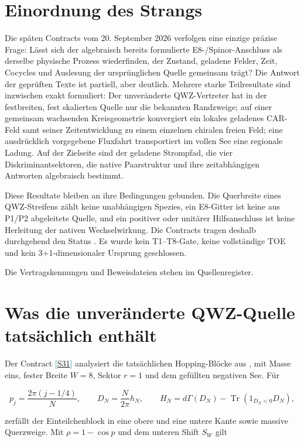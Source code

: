 \documentclass[11pt,a4paper,oneside,parskip=half,headings=normal,numbers=noenddot,bibliography=totoc]{scrreprt}
\newcommand{\src}[1]{\textcolor{teal}{\small[\hyperref[s:#1]{S#1}]}}
\begin{document}
\section{Einordnung des Strangs}

Die späten Contracts vom 20. September 2026 verfolgen eine einzige präzise
Frage: Lässt sich der algebraisch bereits formulierte E8-/Spinor-Anschluss als
derselbe physische Prozess wiederfinden, der Zustand, geladene Felder, Zeit,
Cocycles und Auslesung der ursprünglichen Quelle gemeinsam trägt? Die
Antwort der geprüften Texte ist partiell, aber deutlich. Mehrere starke
Teilresultate sind inzwischen exakt formuliert: Der unveränderte QWZ-Vertreter
hat in der festbreiten, fest skalierten Quelle nur die bekannten Randzweige;
auf einer gemeinsam wachsenden Kreisgeometrie konvergiert ein lokales geladenes
CAR-Feld samt seiner Zeitentwicklung zu einem einzelnen chiralen freien Feld;
eine ausdrücklich vorgegebene Fluxfahrt transportiert im vollen See eine
regionale Ladung. Auf der Zielseite sind der geladene Strompfad, die vier
Diskriminantsektoren, die native Paarstruktur und ihre zeitabhängigen
Antworten algebraisch bestimmt.

Diese Resultate bleiben an ihre Bedingungen gebunden. Die Querbreite eines
QWZ-Streifens zählt keine unabhängigen Spezies, ein E8-Gitter ist keine aus
P1/P2 abgeleitete Quelle, und ein positiver oder unitärer Hilfsanschluss ist
keine Herleitung der nativen Wechselwirkung. Die Contracts tragen deshalb
durchgehend den Status \texttt{}. Es wurde kein T1--T8-Gate, keine vollständige
TOE und kein 3+1-dimensionaler Ursprung geschlossen.

Die Vertragskennungen und Beweisdateien stehen im Quellenregister.

\section{Was die unveränderte QWZ-Quelle tatsächlich enthält}

Der Contract \src{31} analysiert die tatsächlichen
Hopping-Blöcke aus , mit Masse eins,
fester Breite $W=8$, Sektor $r=1$ und dem gefüllten negativen See. Für

\[
 p_j=\frac{2\pi(j-1/4)}{N},\qquad D_N=\frac{N}{2\pi}h_N,\qquad
 H_N=d\Gamma(D_N)-\operatorname{Tr}(1_{D_N<0}D_N),
\]

zerfällt der Einteilchenblock in eine obere und eine untere Kante sowie
massive Querzweige. Mit \(\rho=1-\cos p\) und dem unteren Shift \(S_W\) gilt
\end{document}
